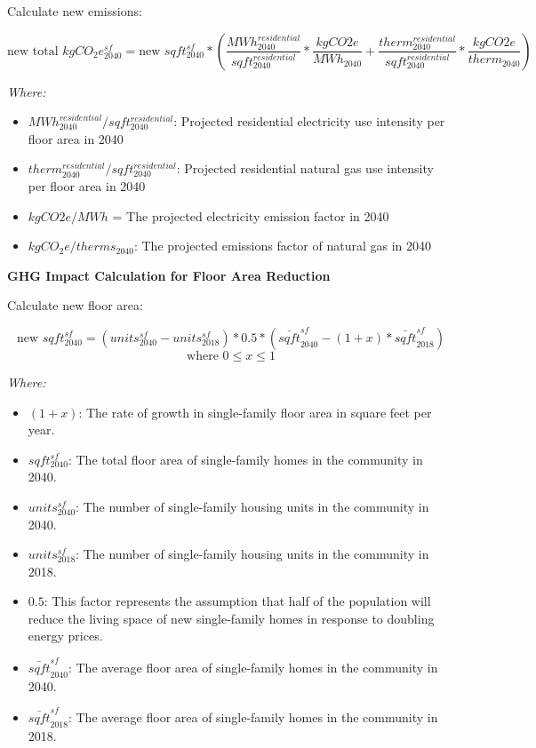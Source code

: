 \documentclass[
]{book}
\providecommand{\tightlist}{%
  \setlength{\itemsep}{0pt}\setlength{\parskip}{0pt}}
\begin{document}
Calculate new emissions:

\[\text{new total }kgCO_2e^{sf}_{2040} = \text{new }sqft_{2040}^{sf} * \left( \frac{MWh_{2040}^{residential}}{sqft_{2040}^{residential}} * \frac{kgCO2e}{MWh_{2040}} + \frac{therm_{2040}^{residential}}{sqft_{2040}^{residential}} * \frac{kgCO2e}{therm_{2040}} \right)\]

\emph{Where:}

\begin{itemize}
\tightlist
\item
  \(MWh_{2040}^{residential}/sqft_{2040}^{residential}\): Projected residential electricity use intensity per floor area in 2040
\item
  \(therm_{2040}^{residential}/sqft_{2040}^{residential}\): Projected residential natural gas use intensity per floor area in 2040
\item
  \(kgCO2e/MWh\) = The projected electricity emission factor in 2040
\item
  \(kgCO_2e/therms_{2040}\): The projected emissions factor of natural gas in 2040
\end{itemize}

\textbf{GHG Impact Calculation for Floor Area Reduction}

Calculate new floor area:

\[\text{new }sqft_{2040}^{sf}  = (units_{2040}^{sf} - units_{2018}^{sf}) * 0.5 * \left(\bar{sqft}_{2040}^{sf}-(1+x) * \bar{sqft}_{2018}^{sf}\right)\]
\[\text{where } 0 \le x \le 1\]

\emph{Where:}

\begin{itemize}
\tightlist
\item
  \((1+x)\): The rate of growth in single-family floor area in square feet per year.
\item
  \(sqft_{2040}^{sf}\): The total floor area of single-family homes in the community in 2040.
\item
  \(units_{2040}^{sf}\): The number of single-family housing units in the community in 2040.
\item
  \(units_{2018}^{sf}\): The number of single-family housing units in the community in 2018.
\item
  \(0.5\): This factor represents the assumption that half of the population will reduce the living space of new single-family homes in response to doubling energy prices.
\item
  \(\bar{sqft}_{2040}^{sf}\): The average floor area of single-family homes in the community in 2040.
\item
  \(\bar{sqft}_{2018}^{sf}\): The average floor area of single-family homes in the community in 2018.
\end{itemize}
\end{document}
